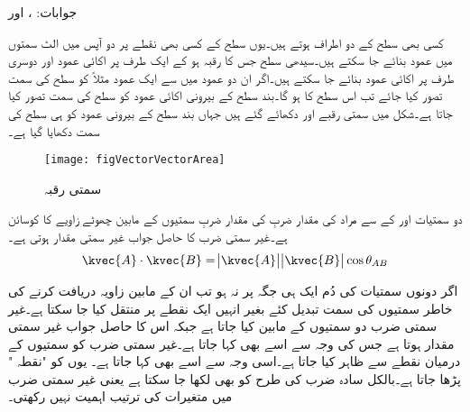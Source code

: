 جوابات: ،  اور 



کسی بھی سطح کے دو اطراف ہوتے ہیں۔یوں سطح کے کسی بھی نقطے پر دو آپس میں الٹ سمتوں میں عمود بنائے جا سکتے ہیں۔سیدھی سطح جس کا رقبہ  ہو کے ایک طرف پر اکائی عمود  اور دوسری طرف پر اکائی عمود  بنائے جا سکتے ہیں۔اگر ان دو عمود میں سے ایک عمود مثلاً  کو سطح کی سمت تصور کیا جائے تب اس سطح کا   ہو گا۔بند سطح کے  بیرونی اکائی عمود کو سطح کی سمت تصور کیا جاتا ہے۔شکل  میں سمتی رقبے  اور  دکھائے گئے ہیں جہاں بند سطح کے بیرونی عمود کو ہی سطح کی سمت دکھایا گیا ہے۔
\begin{figure}
\centering
\texttt{[image: figVectorVectorArea]}
\caption{سمتی رقبہ}
\label{شکل_سمتیہ_سمتی_رقبہ}
\end{figure}


دو سمتیات  اور  کے  سے مراد  کی مقدار ضربِ   کی مقدار ضربِ سمتیوں کے مابین چھوٹے زاویے کا کوسائن ہے۔غیر سمتی ضرب کا حاصل جواب غیر سمتی مقدار ہوتی ہے۔
\begin{align}\label{مساوات_سمتیہ_غیر_سمتی_ضرب}
\kvec{A} \cdot \kvec{B}=\abs{\kvec{A}} \abs{\kvec{B}} \cos \theta_{AB}
\end{align}

اگر دونوں سمتیات کی دُم ایک ہی جگہ پر نہ ہو تب ان کے مابین زاویہ دریافت کرنے کی  خاطر سمتیوں کی سمت تبدیل کئے بغیر انہیں ایک نقطے پر منتقل کیا جا سکتا ہے۔غیر سمتی ضرب دو سمتیوں کے مابین کیا جاتا ہے جبکہ اس کا حاصل جواب غیر سمتی مقدار ہوتا ہے جس کی وجہ سے اسے   بھی کہا جاتا ہے۔غیر سمتی ضرب کو سمتیوں کے درمیان نقطے سے ظاہر کیا جاتا ہے۔اسی وجہ سے اسے  بھی کہا جاتا ہے۔ یوں  کو "نقطہ " پڑھا جاتا ہے۔بالکل سادہ ضرب کی طرح  کو  بھی لکھا جا سکتا ہے یعنی غیر سمتی ضرب میں متغیرات کی ترتیب اہمیت نہیں رکھتی۔

